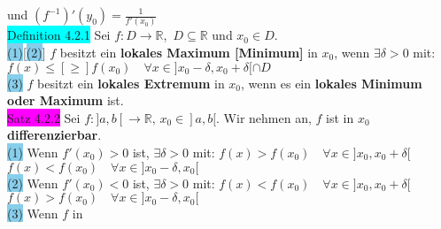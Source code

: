 \documentclass[landscape, 10pt]{article}
\newcommand{\R}{\mathbb{R}}
\begin{document}
\begin{multicols}{3}
                     und \textcolor{NavyBlue}{$(f^{-1})'(y_0)=\frac{1}{f'(x_0)}$}\\
              \colorbox{cyan}{Definition 4.2.1} 
                     Sei \textcolor{NavyBlue}{$f:D\longrightarrow\R$},\,
                     \textcolor{NavyBlue}{$D\subseteq\R$}
                     und \textcolor{NavyBlue}{$x_0\in D$}. \\
                     \colorbox{SkyBlue}{(1)}[\colorbox{SkyBlue}{(2)}] 
                            \textcolor{NavyBlue}{$f$} besitzt ein 
                            \textbf{lokales Maximum [Minimum]} in 
                            \textcolor{NavyBlue}{$x_0$}, wenn 
                            \textcolor{NavyBlue}{$\exists\delta>0$} mit: 
                            \textcolor{NavyBlue}{
                            $f(x)\leqslant[\geqslant] f(x_0)\quad
                            \forall x\in]x_0-\delta,x_0+\delta[\cap D$}\\
                     \colorbox{SkyBlue}{(3)} 
                            $f$ besitzt ein \textbf{lokales Extremum} 
                            in \textcolor{NavyBlue}{$x_0$}, wenn es ein 
                            \textbf{lokales Minimum oder Maximum} ist. \\
              \colorbox{magenta}{Satz 4.2.2} 
                     Sei \textcolor{NavyBlue}{
                     $f:]a,b[\longrightarrow\R,\,x_0\in]a,b[$}. 
                     Wir nehmen an, \textcolor{NavyBlue}{$f$} ist in 
                     \textcolor{NavyBlue}{$x_0$} \textbf{differenzierbar}.\\
                     \colorbox{SkyBlue}{(1)} Wenn \textcolor{NavyBlue}{$f'(x_0)>0$} 
                            ist, \textcolor{NavyBlue}{$\exists\delta>0$} mit: 
                            \textcolor{NavyBlue}{
                            $f(x)>f(x_0)\quad\forall x\in]x_0,x_0+\delta[$}
                            \textcolor{NavyBlue}{
                            $f(x)<f(x_0)\quad\forall x\in]x_0-\delta,x_0[$}\\
                     \colorbox{SkyBlue}{(2)} Wenn 
                            \textcolor{NavyBlue}{$f'(x_0)<0$} ist, 
                            \textcolor{NavyBlue}{$\exists\delta>0$} mit: 
                            \textcolor{NavyBlue}{
                            $f(x)<f(x_0)\quad\forall x\in]x_0,x_0+\delta[$}
                            \textcolor{NavyBlue}{
                            $f(x)>f(x_0)\quad\forall x\in]x_0-\delta,x_0[$}\\ 
                     \colorbox{SkyBlue}{(3)} Wenn \textcolor{NavyBlue}{$f$} in 

\end{multicols}
\end{document}
